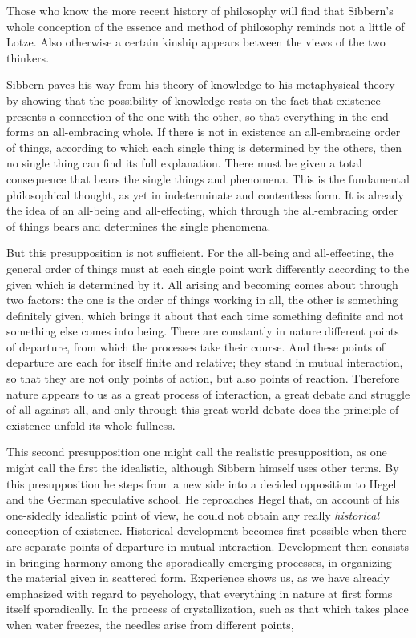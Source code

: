 \documentclass[12pt,a4paper,openany]{book}
\newcommand{\opage}[1]{\marginnote{\footnotesize\textit{[#1]}}}
\begin{document}
Those who know the more recent history of philosophy will find that
Sibbern's whole conception of the essence and method of philosophy
reminds not a little of Lotze. Also otherwise a certain
kinship appears between the views of the two thinkers.

Sibbern paves his way from his theory of knowledge to his
metaphysical theory by showing that the possibility of knowledge rests
on the fact that existence presents a connection of the one
with the other, so that everything in the end forms an all-embracing
whole. If there is not in existence an all-embracing
order of things, according to which each single thing is determined
\opage{86}by the others, then no single thing can find its full
explanation. There must be given a total consequence that bears the
single things and phenomena. This is the fundamental
philosophical thought, as yet in indeterminate and contentless form. It is already
the idea of an all-being and all-effecting, which through the
all-embracing order of things bears and determines the single
phenomena.

But this presupposition is not sufficient. For the
all-being and all-effecting, the general order of things
must at each single point work differently according to the given
which is determined by it. All arising and becoming comes about
through two factors: the one is the order of things working in all,
the other is something definitely given, which brings it about that each
time something definite and not something else comes into being. There are
constantly in nature different points of departure, from which
the processes take their course. And these points of departure are
each for itself finite and relative; they stand in mutual
interaction, so that they are not only points of action, but also
points of reaction. Therefore nature appears to us as
a great process of interaction, a great debate and struggle of
all against all, and only through this great world-debate
does the principle of existence unfold its whole fullness.

This second presupposition one might call the
realistic presupposition, as one might call the first
the idealistic, although Sibbern himself uses other terms.
By this presupposition he steps from a new side into a
decided opposition to Hegel and the German speculative school.
He reproaches Hegel that, on account of his one-sidedly
idealistic point of view, he could not obtain any really \emph{historical}
conception of existence. Historical development becomes first
possible when there are separate points of departure in mutual
interaction. Development then consists in bringing
harmony among the sporadically emerging processes, in
organizing the material given in scattered form. Experience
shows us, as we have already emphasized with regard to psychology,
that everything in nature at first forms itself sporadically.
In the process of crystallization, such as that which takes place
when water freezes, the needles arise from different points,
\end{document}
